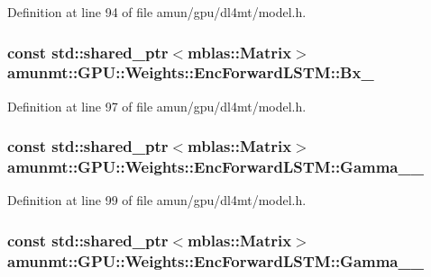 Definition at line 94 of file amun/gpu/dl4mt/model.\+h.

\subsubsection[{\texorpdfstring{Bx\+\_\+}{Bx_}}]{\setlength{\rightskip}{0pt plus 5cm}const std\+::shared\+\_\+ptr$<${\bf mblas\+::\+Matrix}$>$ amunmt\+::\+G\+P\+U\+::\+Weights\+::\+Enc\+Forward\+L\+S\+T\+M\+::\+Bx\+\_\+}\hypertarget{structamunmt_1_1GPU_1_1Weights_1_1EncForwardLSTM_a112f4277841518dfef867f93aa0df0d1}{}\label{structamunmt_1_1GPU_1_1Weights_1_1EncForwardLSTM_a112f4277841518dfef867f93aa0df0d1}


Definition at line 97 of file amun/gpu/dl4mt/model.\+h.

\subsubsection[{\texorpdfstring{Gamma\+\_\+1\+\_\+}{Gamma_1_}}]{\setlength{\rightskip}{0pt plus 5cm}const std\+::shared\+\_\+ptr$<${\bf mblas\+::\+Matrix}$>$ amunmt\+::\+G\+P\+U\+::\+Weights\+::\+Enc\+Forward\+L\+S\+T\+M\+::\+Gamma\+\_\+\_\+}\hypertarget{structamunmt_1_1GPU_1_1Weights_1_1EncForwardLSTM_ad2956f042114b0799d0e7a4284e8346e}{}\label{structamunmt_1_1GPU_1_1Weights_1_1EncForwardLSTM_ad2956f042114b0799d0e7a4284e8346e}


Definition at line 99 of file amun/gpu/dl4mt/model.\+h.

\subsubsection[{\texorpdfstring{Gamma\+\_\+2\+\_\+}{Gamma_2_}}]{\setlength{\rightskip}{0pt plus 5cm}const std\+::shared\+\_\+ptr$<${\bf mblas\+::\+Matrix}$>$ amunmt\+::\+G\+P\+U\+::\+Weights\+::\+Enc\+Forward\+L\+S\+T\+M\+::\+Gamma\+\_\+\_\+}\hypertarget{structamunmt_1_1GPU_1_1Weights_1_1EncForwardLSTM_a59693507f93ca5e40e1ee660a84de31d}{}\label{structamunmt_1_1GPU_1_1Weights_1_1EncForwardLSTM_a59693507f93ca5e40e1ee660a84de31d}


